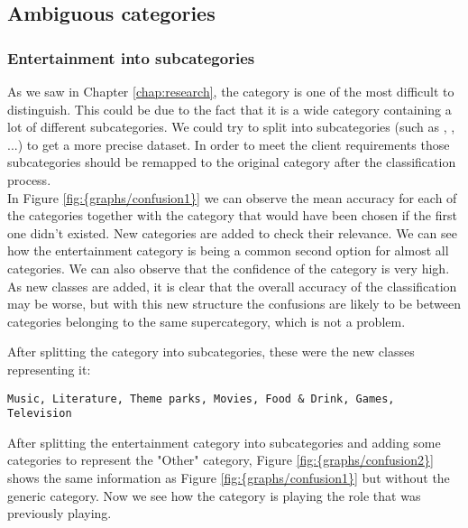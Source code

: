 \subsection{Ambiguous categories}


\subsubsection{Entertainment into subcategories}
As we saw in Chapter \ref{chap:research}, the category  is one of the most difficult to distinguish. This could be due to the fact that it is a wide category containing a lot of different
subcategories. We could try to split  into subcategories (such as , , ...) to get a more precise dataset. In order to meet the
client requirements those subcategories should be remapped to the original  category after the classification process. \\
In Figure \ref{fig:{graphs/confusion1}} we can observe the mean accuracy for each of the categories together with the category that would have been chosen if the first one didn't existed. New
categories are added to check their relevance. We can see how the entertainment category is being a common second option for almost all categories. We can also observe that the confidence of the 
 category is very high.
As new classes are added, it is clear that the overall accuracy of the classification may be worse, but with this new structure the confusions are likely to be between categories belonging to the same
supercategory, which is not a problem.

After splitting the  category into subcategories, these were the new classes representing it: \\
\begin{lstlisting} 
Music, Literature, Theme parks, Movies, Food & Drink, Games, Television
\end{lstlisting} 
After splitting the entertainment category into subcategories and adding some categories to represent the "Other" category, Figure \ref{fig:{graphs/confusion2}} shows the same information as 
Figure \ref{fig:{graphs/confusion1}} but without the generic  category. Now we see how the  category is playing the role that  was previously playing.

